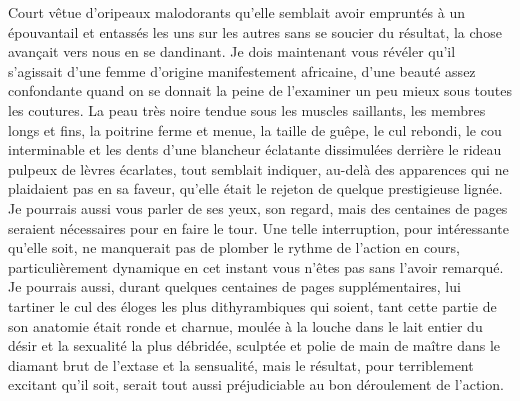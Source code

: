 Court vêtue d’oripeaux malodorants qu’elle semblait avoir empruntés à un épouvantail et entassés les uns sur les autres sans se soucier du résultat, la chose avançait vers nous en se dandinant. Je dois maintenant vous révéler qu’il s’agissait d’une femme d’origine manifestement africaine, d’une beauté assez confondante quand on se donnait la peine de l’examiner un peu mieux sous toutes les coutures. La peau très noire tendue sous les muscles saillants, les membres longs et fins, la poitrine ferme et menue, la taille de guêpe, le cul rebondi, le cou interminable et les dents d’une blancheur éclatante dissimulées derrière le rideau pulpeux de lèvres écarlates, tout semblait indiquer, au-delà des apparences qui ne plaidaient pas en sa faveur, qu’elle était le rejeton de quelque prestigieuse lignée. Je pourrais aussi vous parler de ses yeux, son regard, mais des centaines de pages seraient nécessaires pour en faire le tour. Une telle interruption, pour intéressante qu’elle soit, ne manquerait pas de plomber le rythme de l’action en cours, particulièrement dynamique en cet instant vous n’êtes pas sans l’avoir remarqué. Je pourrais aussi, durant quelques centaines de pages supplémentaires, lui tartiner le cul des éloges les plus dithyrambiques qui soient, tant cette partie de son anatomie était ronde et charnue, moulée à la louche dans le lait entier du désir et la sexualité la plus débridée, sculptée et polie de main de maître dans le diamant brut de l’extase et la sensualité, mais le résultat, pour terriblement excitant qu’il soit, serait tout aussi préjudiciable au bon déroulement de l’action.

